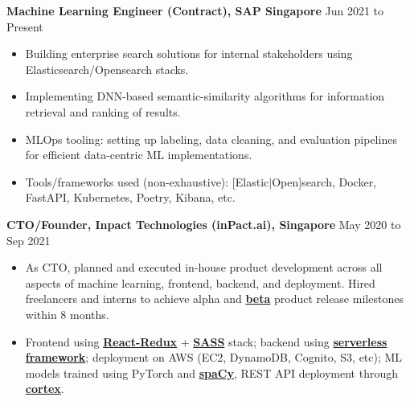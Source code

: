 \documentclass[10pt]{article}
\newenvironment{myinnerlist}[1][\enskip\textbullet]%
        {\begin{itemize}[#1,leftmargin=*,parsep=0pt,itemsep=3pt,topsep=0pt,partopsep=0pt]}
        {\end{itemize}\vspace{.6\baselineskip}}
\newcommand{\localtextbulletone}{\textcolor{gray}{\raisebox{.45ex}{\rule{.8ex}{.8ex}}}}
\begin{document}
{
    \hspace*{-\marginparsep minus \marginparwidth}%
    \begin{minipage}[t]{\textwidth+\marginparwidth+\marginparsep}%

        \textbf{Machine Learning Engineer (Contract), SAP Singapore} \hfill {Jun 2021 to Present}

        \vspace{0.1in}
        \begin{myinnerlist}
            \renewcommand{\labelitemi}{\localtextbulletone}

            \item Building enterprise search solutions for internal stakeholders using Elasticsearch/Opensearch stacks.
            \item Implementing DNN-based semantic-similarity algorithms for information retrieval and ranking of results.
            \item MLOps tooling: setting up labeling, data cleaning, and evaluation pipelines for efficient data-centric ML implementations.
            \item Tools/frameworks used (non-exhaustive): [Elastic$\vert$Open]search, Docker, FastAPI, Kubernetes, Poetry, Kibana, etc.

        \end{myinnerlist}

        \textbf{CTO/Founder, Inpact Technologies (inPact.ai), Singapore} \hfill {May 2020 to Sep 2021}

        \vspace{0.1in}
        \begin{myinnerlist}
            \renewcommand{\labelitemi}{\localtextbulletone}

            \item As CTO, planned and executed in-house product development
                across all aspects of machine learning, frontend, backend, and
                deployment. Hired freelancers and interns to achieve alpha and
                \href{https://raw.githubusercontent.com/sidmontu/sidmontu.github.io/master/misc/beta_screen.png}{\bf
                beta} product release milestones within 8 months.

            \item Frontend using \href{https://react-redux.js.org/}{\bf
                React-Redux} + \href{https://sass-lang.com/}{\bf SASS} stack;
                backend using \href{https://aws.amazon.com/serverless/}{\bf
                serverless framework}; deployment on AWS (EC2, DynamoDB,
                Cognito, S3, etc); ML models trained using PyTorch and
                \href{https://spacy.io/}{\bf spaCy}, REST API deployment through
                \href{https://www.cortex.dev/}{\bf cortex}.


\end{myinnerlist}
\end{minipage}}
\end{document}
